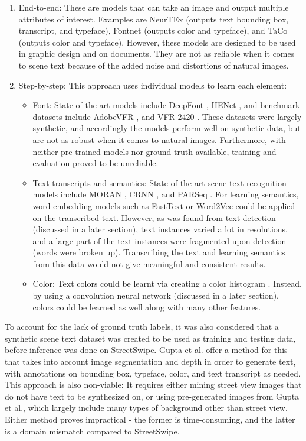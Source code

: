 \begin{enumerate}
    \item End-to-end: These are models that can take an image and output multiple attributes of interest. Examples are NeurTEx \cite{aggarwal_neurtex_2022} (outputs text bounding box, transcript, and typeface), Fontnet \cite{s_fontnet_2021} (outputs color and typeface), and TaCo \cite{nie_taco_2022} (outputs color and typeface). However, these models are designed to be used in graphic design and on documents. They are not as reliable when it comes to scene text because of the added noise and distortions of natural images.
    \item Step-by-step: This approach uses individual models to learn each element:
    \begin{itemize}
        \item Font: State-of-the-art models include DeepFont \cite{wang_deepfont_2015}, HENet \cite{chen_henet_2021}, and benchmark datasets include AdobeVFR \cite{wang_deepfont_2015}, and VFR-2420 \cite{chen_large-scale_2014}. These datasets were largely synthetic, and accordingly the models perform well on synthetic data, but are not as robust when it comes to natural images. Furthermore, with neither pre-trained models nor ground truth available, training and evaluation proved to be unreliable.
        \item Text transcripts and semantics: State-of-the-art scene text recognition models include MORAN \cite{luo_multi-object_2019}, CRNN \cite{shi_end2end_2015}, and PARSeq \cite{bautista_scene_2022}. For learning semantics, word embedding models such as FastText \cite{bojanowski_enriching_2017} or Word2Vec \cite{mikolov_efficient_2013} could be applied on the transcribed text. However, as was found from text detection (discussed in a later section), text instances varied a lot in resolutions, and a large part of the text instances were fragmented upon detection (words were broken up). Transcribing the text and learning semantics from this data would not give meaningful and consistent results.
        \item Color: Text colors could be learnt via creating a color histogram \cite{srivastava_review_2015}. Instead, by using a convolution neural network (discussed in a later section), colors could be learned as well along with many other features.
    \end{itemize}
\end{enumerate}

To account for the lack of ground truth labels, it was also considered that a synthetic scene text dataset was created to be used as training and testing data, before inference was done on StreetSwipe. Gupta et al. \cite{gupta_synt_2016} offer a method for this that takes into account image segmentation and depth in order to generate text, with annotations on bounding box, typeface, color, and text transcript as needed. This approach is also non-viable: It requires either mining street view images that do not have text to be synthesized on, or using pre-generated images from Gupta et al., which largely include many types of background other than street view. Either method proves impractical - the former is time-consuming, and the latter is a domain mismatch compared to StreetSwipe.

